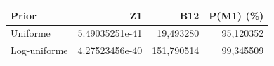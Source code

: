 \begin{tabular}{lrrr}
\toprule
Prior & Z1 & B12 & P(M1) (\%) \\
\midrule
Uniforme & 5.49035251e-41 & 19,493280 & 95,120352 \\
Log-uniforme & 4.27523456e-40 & 151,790514 & 99,345509 \\
\bottomrule
\end{tabular}
